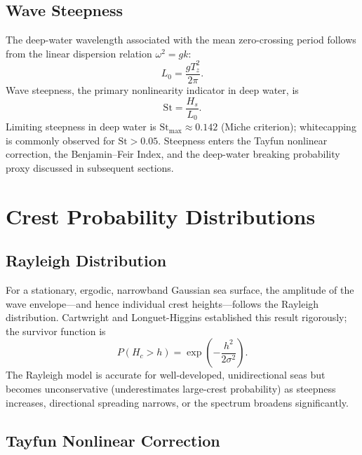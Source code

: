 \documentclass[journal]{IEEEtran}
\begin{document}
    \subsection{Wave Steepness}

    The deep-water wavelength associated with the mean zero-crossing period
    follows from the linear dispersion relation $\omega^2 = gk$:
    \begin{equation}
        L_0 = \frac{g T_z^2}{2\pi}.
    \end{equation}
    Wave steepness, the primary nonlinearity indicator in deep water, is
    \begin{equation}
        \mathrm{St} = \frac{H_s}{L_0}.
    \end{equation}
    Limiting steepness in deep water is $\mathrm{St}_\mathrm{max} \approx 0.142$
    (Miche criterion); whitecapping is commonly observed for
    $\mathrm{St} > 0.05$.
    Steepness enters the Tayfun nonlinear correction, the
    Benjamin--Feir Index, and the deep-water breaking probability proxy
    discussed in subsequent sections.

    \section{Crest Probability Distributions}
    \label{sec:probabilities}

    \subsection{Rayleigh Distribution}

    For a stationary, ergodic, narrowband Gaussian sea surface, the
    amplitude of the wave envelope---and hence individual crest
    heights---follows the Rayleigh distribution.
    Cartwright and Longuet-Higgins \cite{Cartwright1956} established this
    result rigorously; the survivor function is
    \begin{equation}
        P(H_c > h) = \exp\!\left(-\frac{h^2}{2\sigma^2}\right).
        \label{eq:rayleigh}
    \end{equation}
    The Rayleigh model is accurate for well-developed, unidirectional seas
    but becomes unconservative (underestimates large-crest probability) as
    steepness increases, directional spreading narrows, or the spectrum
    broadens significantly.

    \subsection{Tayfun Nonlinear Correction}
\end{document}
